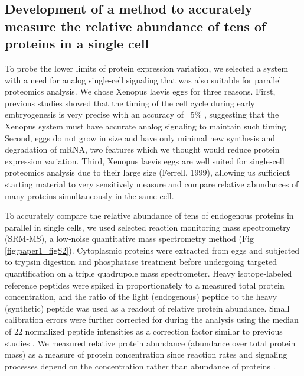 \subsection{Development of a method to accurately measure the relative abundance of tens of proteins in a single cell}

To probe the lower limits of protein expression variation, we selected a system with a need for analog single‐cell signaling that was also suitable for parallel proteomics analysis. We chose Xenopus laevis eggs for three reasons. First, previous studies showed that the timing of the cell cycle during early embryogenesis is very precise with an accuracy of ~5\% \cite{Tsai2014}, suggesting that the Xenopus system must have accurate analog signaling to maintain such timing. Second, eggs do not grow in size and have only minimal new synthesis and degradation of mRNA, two features which we thought would reduce protein expression variation. Third, Xenopus laevis eggs are well suited for single‐cell proteomics analysis due to their large size (Ferrell, 1999), allowing us sufficient starting material to very sensitively measure and compare relative abundances of many proteins simultaneously in the same cell.

To accurately compare the relative abundance of tens of endogenous proteins in parallel in single cells, we used selected reaction monitoring mass spectrometry (SRM‐MS), a low‐noise quantitative mass spectrometry method \cite{Abell2011,Picotti2012,Ahrends2014} (Fig \ref{fig:paper1_figS2}). Cytoplasmic proteins were extracted from eggs and subjected to trypsin digestion and phosphatase treatment before undergoing targeted quantification on a triple quadrupole mass spectrometer. Heavy isotope‐labeled reference peptides were spiked in proportionately to a measured total protein concentration, and the ratio of the light (endogenous) peptide to the heavy (synthetic) peptide was used as a readout of relative protein abundance. Small calibration errors were further corrected for during the analysis using the median of 22 normalized peptide intensities as a correction factor similar to previous studies \cite{Abell2011,Ludwig2012,Picotti2012}. We measured relative protein abundance (abundance over total protein mass) as a measure of protein concentration since reaction rates and signaling processes depend on the concentration rather than abundance of proteins \cite{Padovan-Merhar2015}.

